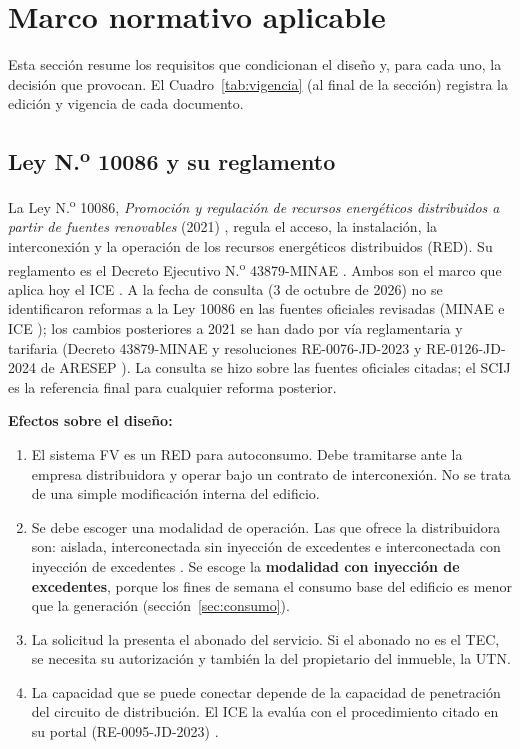 \documentclass[12pt]{article}
\begin{document}
\section{Marco normativo aplicable}
\label{sec:normativa}
Esta sección resume los requisitos que condicionan el diseño y, para cada uno, la decisión que provocan. El Cuadro~\ref{tab:vigencia} (al final de la sección) registra la edición y vigencia de cada documento.

\subsection{Ley N.\textsuperscript{o} 10086 y su reglamento}
La Ley N.\textsuperscript{o} 10086, \emph{Promoción y regulación de recursos energéticos distribuidos a partir de fuentes renovables} (2021) \cite{ley10086}, regula el acceso, la instalación, la interconexión y la operación de los recursos energéticos distribuidos (RED). Su reglamento es el Decreto Ejecutivo N.\textsuperscript{o} 43879-MINAE \cite{reg43879}. Ambos son el marco que aplica hoy el ICE \cite{iceGD}. A la fecha de consulta (3 de octubre de 2026) no se identificaron reformas a la Ley 10086 en las fuentes oficiales revisadas (MINAE \cite{minaeMarco} e ICE \cite{iceGD}); los cambios posteriores a 2021 se han dado por vía reglamentaria y tarifaria (Decreto 43879-MINAE y resoluciones RE-0076-JD-2023 y RE-0126-JD-2024 de ARESEP \cite{aresepMetod}). La consulta se hizo sobre las fuentes oficiales citadas; el SCIJ es la referencia final para cualquier reforma posterior.

\textbf{Efectos sobre el diseño:}
\begin{enumerate}[label=(\alph*)]
\item El sistema FV es un RED para autoconsumo. Debe tramitarse ante la empresa distribuidora y operar bajo un contrato de interconexión. No se trata de una simple modificación interna del edificio.
\item Se debe escoger una modalidad de operación. Las que ofrece la distribuidora son: aislada, interconectada sin inyección de excedentes e interconectada con inyección de excedentes \cite{iceGD}. Se escoge la \textbf{modalidad con inyección de excedentes}, porque los fines de semana el consumo base del edificio es menor que la generación (sección~\ref{sec:consumo}).
\item La solicitud la presenta el abonado del servicio. Si el abonado no es el TEC, se necesita su autorización y también la del propietario del inmueble, la UTN.
\item La capacidad que se puede conectar depende de la capacidad de penetración del circuito de distribución. El ICE la evalúa con el procedimiento citado en su portal (RE-0095-JD-2023) \cite{iceGD}.
\end{enumerate}
\end{document}
